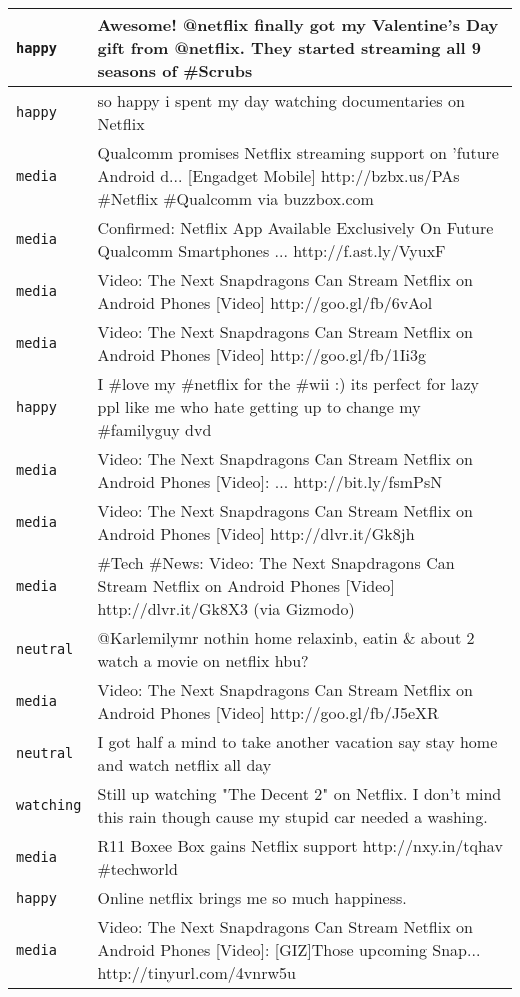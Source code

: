 \begin{center}
\begin{longtable}{|l|p{120mm}|}
      \tabularnewline\hline
         \texttt{happy} & Awesome! @netflix finally got my Valentine's Day gift from @netflix. They started streaming all 9 seasons of \#Scrubs
      \tabularnewline\hline
         \texttt{happy} & so happy i spent my day watching documentaries on Netflix
      \tabularnewline\hline
         \texttt{media} & Qualcomm promises Netflix streaming support on 'future Android d... [Engadget Mobile] http://bzbx.us/PAs \#Netflix \#Qualcomm via buzzbox.com
      \tabularnewline\hline
         \texttt{media} & Confirmed: Netflix App Available Exclusively On Future Qualcomm Smartphones ... http://f.ast.ly/VyuxF
      \tabularnewline\hline
         \texttt{media} & Video: The Next Snapdragons Can Stream Netflix on Android Phones [Video] http://goo.gl/fb/6vAol
      \tabularnewline\hline
         \texttt{media} & Video: The Next Snapdragons Can Stream Netflix on Android Phones [Video] http://goo.gl/fb/1Ii3g
      \tabularnewline\hline
         \texttt{happy} & I \#love my \#netflix for the \#wii :) its perfect for lazy ppl like me who hate getting up to change my \#familyguy dvd
      \tabularnewline\hline
         \texttt{media} & Video: The Next Snapdragons Can Stream Netflix on Android Phones [Video]:								... http://bit.ly/fsmPsN
      \tabularnewline\hline
         \texttt{media} & Video: The Next Snapdragons Can Stream Netflix on Android Phones [Video] http://dlvr.it/Gk8jh
      \tabularnewline\hline
         \texttt{media} & \#Tech \#News: Video: The Next Snapdragons Can Stream Netflix on Android Phones [Video] http://dlvr.it/Gk8X3 (via Gizmodo)
      \tabularnewline\hline
         \texttt{neutral} & @Karlemilymr nothin home relaxinb, eatin \& about 2 watch a movie on netflix hbu?
      \tabularnewline\hline
         \texttt{media} & Video: The Next Snapdragons Can Stream Netflix on Android Phones [Video] http://goo.gl/fb/J5eXR
      \tabularnewline\hline
         \texttt{neutral} & I got half a mind to take another vacation say stay home and watch netflix all day
      \tabularnewline\hline
         \texttt{watching} & Still up watching "The Decent 2" on Netflix. I don't mind this rain though cause my stupid car needed a washing.
      \tabularnewline\hline
         \texttt{media} & R11 Boxee Box gains Netflix support http://nxy.in/tqhav \#techworld
      \tabularnewline\hline
         \texttt{happy} & Online netflix brings me so much happiness.
      \tabularnewline\hline
         \texttt{media} & Video: The Next Snapdragons Can Stream Netflix on Android Phones [Video]: [GIZ]Those upcoming Snap... http://tinyurl.com/4vnrw5u
      \tabularnewline\hline

\end{longtable}
\end{center}
